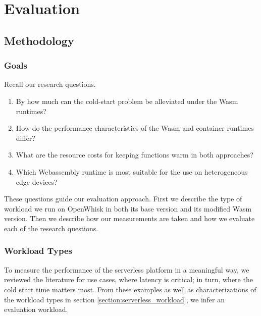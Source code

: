 \chapter{Evaluation}
\label{chapter:evaluation}

\section{Methodology}

\subsection{Goals}

Recall our research questions.

\begin{enumerate}
    \item By how much can the cold-start problem be alleviated under the Wasm runtimes?
  
    \item How do the performance characteristics of the Wasm and container runtimes differ?
  
    \item What are the resource costs for keeping functions warm in both approaches?
  
    \item Which Webassembly runtime is most suitable for the use on heterogeneous edge devices?
\end{enumerate}

These questions guide our evaluation approach. First we describe the type of workload we run on OpenWhisk in both its base version and its modified Wasm version. Then we describe how our measurements are taken and how we evaluate each of the research questions. 

\subsection{Workload Types}

To measure the performance of the serverless platform in a meaningful way, we reviewed the literature for use cases, where latency is critical; in turn, where the cold start time matters most. From these examples as well as characterizations of the workload types in section \ref{section:serverless_workload}, we infer an evaluation workload.

